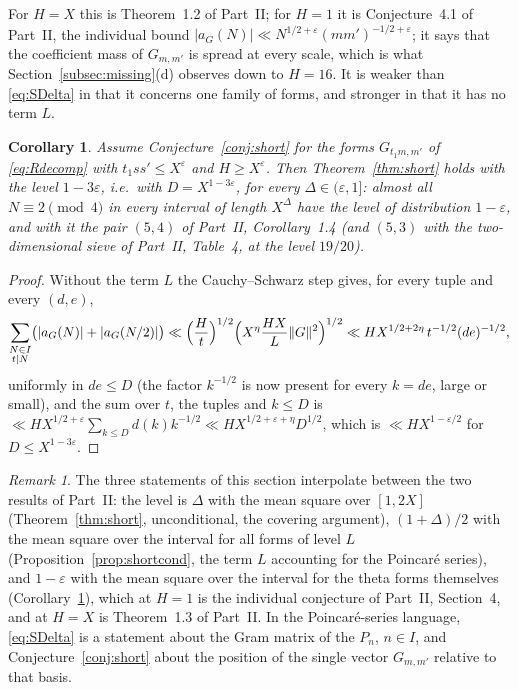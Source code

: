 \documentclass[11pt]{amsart}
\newtheorem{corollary}[theorem]{Corollary}
\theoremstyle{remark}
\newtheorem{remark}[theorem]{Remark}
\newcommand{\e}{\varepsilon}
\begin{document}
For $H=X$ this is Theorem~1.2 of Part~II; for $H=1$ it is Conjecture~4.1 of Part~II, the individual bound $|a_G(N)|\ll N^{1/2+\e}(mm')^{-1/2+\e}$; it says that the coefficient mass of $G_{m,m'}$ is spread at every scale, which is what Section~\ref{subsec:missing}(d) observes down to $H=16$. It is weaker than \eqref{eq:SDelta} in that it concerns one family of forms, and stronger in that it has no term $L$.

\begin{corollary}\label{cor:short}
Assume Conjecture~\ref{conj:short} for the forms $G_{t_1m,m'}$ of \eqref{eq:Rdecomp} with $t_1ss'\le X^\e$ and $H\ge X^{\e}$. Then Theorem~\ref{thm:short} holds with the level $1-3\e$, i.e.\ with $D=X^{1-3\e}$, for every $\Delta\in(\e,1]$: almost all $N\equiv2\pmod 4$ in every interval of length $X^\Delta$ have the level of distribution $1-\e$, and with it the pair $(5,4)$ of Part~II, Corollary~1.4 (and $(5,3)$ with the two-dimensional sieve of Part~II, Table~4, at the level $19/20$).
\end{corollary}
\begin{proof}
Without the term $L$ the Cauchy--Schwarz step gives, for every tuple and every $(d,e)$,
\[
\sum_{\substack{N\in I\\ t\mid N}}\bigl(|a_G(N)|+|a_G(N/2)|\bigr)\ll\Bigl(\frac Ht\Bigr)^{1/2}\Bigl(X^{\eta}\frac{HX}{L}\|G\|^2\Bigr)^{1/2}\ll HX^{1/2+2\eta}\,t^{-1/2}(de)^{-1/2},
\]
uniformly in $de\le D$ (the factor $k^{-1/2}$ is now present for every $k=de$, large or small), and the sum over $t$, the tuples and $k\le D$ is $\ll HX^{1/2+\e}\sum_{k\le D}d(k)k^{-1/2}\ll HX^{1/2+\e+\eta}D^{1/2}$, which is $\ll HX^{1-\e/2}$ for $D\le X^{1-3\e}$.
\end{proof}

\begin{remark}
The three statements of this section interpolate between the two results of Part~II: the level is $\Delta$ with the mean square over $[1,2X]$ (Theorem~\ref{thm:short}, unconditional, the covering argument), $(1+\Delta)/2$ with the mean square over the interval for all forms of level $L$ (Proposition~\ref{prop:shortcond}, the term $L$ accounting for the Poincar\'e series), and $1-\e$ with the mean square over the interval for the theta forms themselves (Corollary~\ref{cor:short}), which at $H=1$ is the individual conjecture of Part~II, Section~4, and at $H=X$ is Theorem~1.3 of Part~II. In the Poincar\'e-series language, \eqref{eq:SDelta} is a statement about the Gram matrix of the $P_n$, $n\in I$, and Conjecture~\ref{conj:short} about the position of the single vector $G_{m,m'}$ relative to that basis.
\end{remark}
\end{document}
